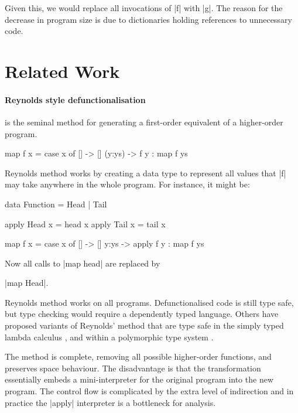 \documentclass[preprint]{sigplanconf}
\begin{document}
Given this, we would replace all invocations of |f| with |g|. The reason for the decrease in program size is due to dictionaries holding references to unnecessary code.

\section{Related Work}
\label{sec:related}

\paragraph{Reynolds style defunctionalisation} \cite{reynolds:defunc} is the seminal method for generating a first-order equivalent of a higher-order program.

\begin{example}
\begin{code}
map f x = case  x of
                []      -> []
                (y:ys)  -> f y : map f ys
\end{code}

\noindent Reynolds method works by creating a data type to represent all values that |f| may take anywhere in the whole program. For instance, it might be:

\ignore\begin{code}
data Function = Head | Tail

apply Head  x = head  x
apply Tail  x = tail  x

map f x = case  x of
                []    -> []
                y:ys  -> apply f y : map f ys
\end{code}

\noindent Now all calls to |map head| are replaced by \ignore|map Head|.
\end{example}

Reynolds method works on all programs. Defunctionalised code is still type safe, but type checking would require a dependently typed language. Others have proposed variants of Reynolds' method that are type safe in the simply typed lambda calculus \cite{bell:type_driven_defunctionalization}, and within a polymorphic type system \cite{pottier:polymorhpic_typed_defunctionaization}.

The method is complete, removing all possible higher-order functions, and preserves space behaviour. The disadvantage is that the transformation essentially embeds a mini-interpreter for the original program into the new program. The control flow is complicated by the extra level of indirection and in practice the |apply| interpreter is a bottleneck for analysis.
\end{document}
